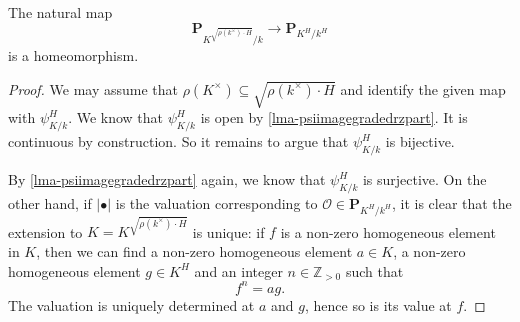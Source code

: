 \begin{corollary}\label{cor-Prestric1}
    The natural map 
    \[
        \mathbf{P}_{K^{\sqrt{\rho(k^{\times})\cdot H}}/k}\rightarrow \mathbf{P}_{K^H/k^H}  
    \]
    is a homeomorphism.
\end{corollary}
\begin{proof}
    We may assume that $\rho(K^{\times})\subseteq \sqrt{\rho(k^{\times})\cdot H}$ and identify the given map with $\psi_{K/k}^H$. We know that $\psi_{K/k}^H$ is open by \cref{lma-psiimagegradedrzpart}. It is continuous by construction. So it remains to argue that $\psi_{K/k}^H$ is bijective. 
    
    By \cref{lma-psiimagegradedrzpart} again, we know that $\psi_{K/k}^H$ is surjective. On the other hand, if $|\bullet|$ is the valuation corresponding to $\mathcal{O}\in \mathbf{P}_{K^H/k^H}$, it is clear that the extension to $K=K^{\sqrt{\rho(k^{\times})\cdot H}}$ is unique: if $f$ is a non-zero homogeneous element in $K$, then we can find a non-zero homogeneous element $a\in K$, a non-zero homogeneous element $g\in K^H$ and an integer $n\in \mathbb{Z}_{>0}$ such that
    \[
        f^n=ag.  
    \]
    The valuation is uniquely determined at $a$ and $g$, hence so is its value at $f$.
\end{proof}

